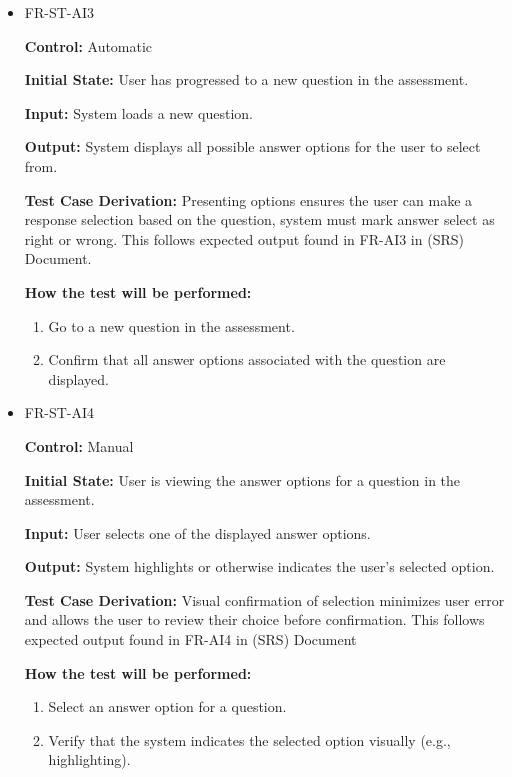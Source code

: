 \documentclass[12pt, titlepage]{article}
\begin{document}
\begin{itemize}
  \item FR-ST-AI3
    \begin{mdframed}[linewidth=0.5mm]
      \textbf{Control:} Automatic \par
      \textbf{Initial State:} User has progressed to a new question in the assessment. \par
      \textbf{Input:} System loads a new question. \par
      \textbf{Output:} System displays all possible answer options for the user to select from. \par
      \textbf{Test Case Derivation:} Presenting options ensures the user can make a response selection based
       on the question, system must mark answer select as right or wrong. 
       This follows expected output found in FR-AI3 in (SRS) Document. \par
      \textbf{How the test will be performed:}
      \begin{enumerate}[noitemsep]
        \item Go to a new question in the assessment.
        \item Confirm that all answer options associated with the question are displayed.
      \end{enumerate}
    \end{mdframed}

  \item FR-ST-AI4
    \begin{mdframed}[linewidth=0.5mm]
      \textbf{Control:} Manual \par
      \textbf{Initial State:} User is viewing the answer options for a question in the assessment. \par
      \textbf{Input:} User selects one of the displayed answer options. \par
      \textbf{Output:} System highlights or otherwise indicates the user’s selected option. \par
      \textbf{Test Case Derivation:} Visual confirmation of selection minimizes user error and allows
       the user to review their choice before confirmation. 
       This follows expected output found in FR-AI4 in (SRS) Document  \par
      \textbf{How the test will be performed:}
      \begin{enumerate}[noitemsep]
        \item Select an answer option for a question.
        \item Verify that the system indicates the selected option visually (e.g., highlighting).
      \end{enumerate}
    \end{mdframed}


\end{itemize}
\end{document}
